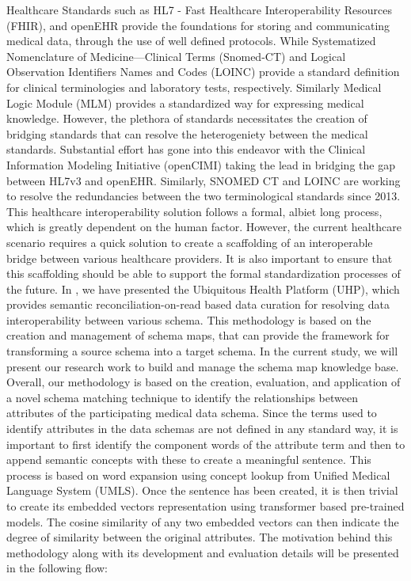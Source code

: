 \documentclass{ieeeaccess}
\begin{document}
Healthcare Standards such as HL7 - Fast Healthcare Interoperability Resources (FHIR), and openEHR provide the foundations for storing and communicating medical data, through the use of well defined protocols. While Systematized Nomenclature of Medicine—Clinical Terms (Snomed-CT) \cite{snomedct_url} and Logical Observation Identifiers Names and Codes (LOINC) \cite{loinc} provide a standard definition for clinical terminologies and laboratory tests, respectively. Similarly Medical Logic Module (MLM) provides a standardized way for expressing medical knowledge. However, the plethora of standards necessitates the creation of bridging standards that can resolve the heterogeniety between the medical standards. Substantial effort has gone into this endeavor with the Clinical Information Modeling Initiative (openCIMI) \cite{CIMI2015} taking the lead in bridging the gap between HL7v3 and openEHR. Similarly, SNOMED CT and LOINC are working to resolve the redundancies between the two terminological standards since 2013. This healthcare interoperability solution follows a formal, albiet long process, which is greatly dependent on the human factor. However, the current healthcare scenario requires a quick solution to create a scaffolding of an interoperable bridge between various healthcare providers. It is also important to ensure that this scaffolding should be able to support the formal standardization processes of the future. In \cite{Satti2020}, we have presented the Ubiquitous Health Platform (UHP), which provides semantic reconciliation-on-read based data curation for resolving data interoperability between various schema. This methodology is based on the creation and management of schema maps, that can provide the framework for transforming a source schema into a target schema. 
In the current study, we will present our research work to build and manage the schema map knowledge base. Overall, our methodology is based on the creation, evaluation, and application of a novel schema matching technique to identify the relationships between attributes of the participating medical data schema. Since the terms used to identify attributes in the data schemas are not defined in any standard way, it is important to first identify the component words of the attribute term and then to append semantic concepts with these to create a meaningful sentence. This process is based on word expansion using concept lookup from Unified Medical Language System (UMLS). Once the sentence has been created, it is then trivial to create its embedded vectors representation using transformer based pre-trained models. The cosine similarity of any two embedded vectors can then indicate the degree of similarity between the original attributes. The motivation behind this methodology along with its development and evaluation details will be presented in the following flow:
\end{document}
